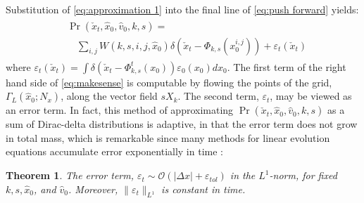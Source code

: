 \documentclass[letterpaper,10pt,conference]{ieeeconf}
\newtheorem{thm}{Theorem}
\begin{document}
Substitution of \eqref{eq:approximation 1} into the final line of \eqref{eq:push forward} yields:
\begin{align}
	\begin{split}
	&\Pr( \check{x}_t , \hat{x}_0, \hat{v}_0, k,s) = \\
	&\quad \sum_{i,j} W(k,s,i,j,\hat{x}_0) \delta \left( \check{x}_t - \Phi_{k,s}( x_0^{i,j}) \right) + \varepsilon_t( \check{x}_t)
	\end{split}
	\label{eq:makesense}
\end{align}
where $\varepsilon_t( \check{x}_t) = \int \delta\left( \check{x}_t - \Phi_{k,s}^{t}( x_0) \right)  \varepsilon_0(x_0) dx_0$.
The first term of the right hand side of \eqref{eq:makesense} is computable by flowing the points of the grid, $\Gamma_L(\hat{x}_0; N_x)$, along the vector field $s X_k$.
The second term, $\varepsilon_t$, may be viewed as an error term.
In fact, this method of approximating $\Pr( \check{x}_t , \hat{x}_0, \hat{v}_0, k,s)$ as a sum of Dirac-delta distributions is adaptive, in that the error term does not grow in total mass, which is remarkable since many methods for linear evolution equations accumulate error exponentially in time \cite{Leveque1992,Gottlieb2001}:

\begin{thm} \label{thm:error}
	The error term, $\varepsilon_t \sim \mathcal{O}( | \Delta x | + \varepsilon_{tol} )$ in the $L^1$-norm, for fixed $k,s,\hat{x}_0$, and $\hat{v}_0$.
	Moreover, $\| \varepsilon_t \|_{L^1}$ is constant in time.
\end{thm}
\end{document}
